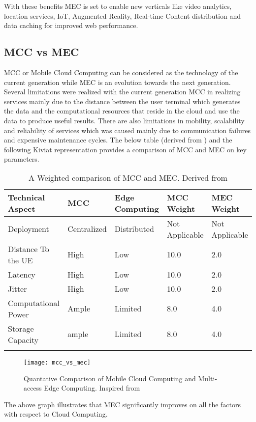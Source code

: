 With these benefits MEC is set to enable new verticals like video analytics, location services, IoT, Augmented Reality, Real-time Content distribution and data caching for improved web performance. 

\subsection{MCC vs MEC}

MCC or Mobile Cloud Computing can be considered as the technology of the current generation while MEC is an evolution towards the next generation. Several limitations were realized with the current generation MCC in realizing services mainly due to the distance between the user terminal which generates the data and the computational resources that reside in the cloud and use the data to produce useful results. There are also limitations in mobility, scalability and reliability of services which was caused mainly due to communication failures and expensive maintenance cycles. The below table (derived from \cite[p.1628]{mach17}) and the following Kiviat representation provides a comparison of MCC and MEC on key parameters.


\begin{longtable}[t!]{|p{}|p{}|p{}|p{}|p{}|}
\hline\hline
\textbf{Technical Aspect}&\textbf{MCC}&\textbf{Edge Computing}&\textbf{MCC Weight}&\textbf{MEC Weight}\\
\hline\hline
\hline
Deployment&Centralized&Distributed&Not Applicable&Not Applicable\\
\hline
Distance To the UE&High&Low&10.0&2.0\\
\hline
Latency&High&Low&10.0&2.0\\
\hline
Jitter&High&Low&10.0&2.0\\
\hline
Computational Power&Ample&Limited&8.0&4.0\\
\hline
Storage Capacity&ample&Limited&8.0&4.0\\
\hline
\hline\hline

\caption{A Weighted comparison of MCC and MEC\@. Derived from \cite[p.1628]{mach17}}
\label{tab:tab1}
\end{longtable}

\begin{figure}[h!]
\texttt{[image: mcc\_vs\_mec]}
\label{fig:2}
\caption{Quantative Comparison of Mobile Cloud Computing and Multi-access Edge Computing. Inspired from \protect\cite{mach17}}
\end{figure}

The above graph illustrates that MEC significantly improves on all the factors with respect to Cloud Computing.
